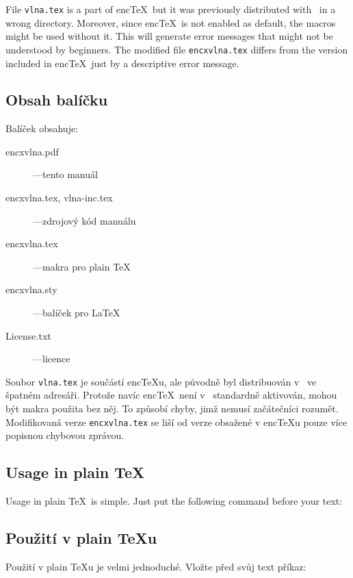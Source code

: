 File \texttt{vlna.tex} is a part of enc\TeX\ but it was previously distributed with \TL\ in a wrong
directory. Moreover, since enc\TeX\ is not enabled as default, the macros might be used without it.
This will generate error messages that might not be understood by beginners. The modified file
\texttt{encxvlna.tex} differs from
the version included in enc\TeX\ just by a descriptive error message.

\else

\edef\pom{---\space\ignorespaces}

\subsection{\texorpdfstring{Obsah balíčku}{Obsah balicku}}
Balíček obsahuje:
\begin{description}
\item[encxvlna.pdf] \pom tento manuál
\item[encxvlna.tex, vlna-inc.tex] \pom zdrojový kód manuálu
\item[encxvlna.tex] \pom makra pro plain \TeX
\item[encxvlna.sty] \pom balíček pro \LaTeX
\item[License.txt] \pom licence
\end{description}

Soubor \texttt{vlna.tex} je součástí enc\TeX{}u, ale původně byl distribuován v \TL\ ve špatném
adresáři. Protože navíc enc\TeX\ není v \TL\ standardně aktivován, mohou být makra použita bez něj.
To způsobí chyby, jimž nemusí začátečníci rozumět. Modifikovaná verze \texttt{encxvlna.tex} se liší od verze obsažené v
enc\TeX{}u pouze více popisnou chybovou zprávou.

\fi


\ifeng

\subsection{Usage in plain \TeX}
Usage in plain \TeX\ is simple. Just put the following command before your text:

\else

\subsection{\texorpdfstring{Použití}{Pouziti} v plain \TeX u}
Použití v plain \TeX{}u je velmi jednoduché. Vložte před svůj text příkaz:

